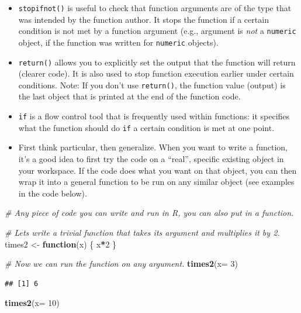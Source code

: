 \documentclass[
]{book}
\newenvironment{Shaded}{\begin{snugshade}}{\end{snugshade}}
\newcommand{\AttributeTok}[1]{\textcolor[rgb]{0.13,0.29,0.53}{#1}}
\newcommand{\CommentTok}[1]{\textcolor[rgb]{0.56,0.35,0.01}{\textit{#1}}}
\newcommand{\ControlFlowTok}[1]{\textcolor[rgb]{0.13,0.29,0.53}{\textbf{#1}}}
\newcommand{\DecValTok}[1]{\textcolor[rgb]{0.00,0.00,0.81}{#1}}
\newcommand{\FunctionTok}[1]{\textcolor[rgb]{0.13,0.29,0.53}{\textbf{#1}}}
\newcommand{\NormalTok}[1]{#1}
\newcommand{\OtherTok}[1]{\textcolor[rgb]{0.56,0.35,0.01}{#1}}
\newcommand{\SpecialCharTok}[1]{\textcolor[rgb]{0.81,0.36,0.00}{\textbf{#1}}}
\providecommand{\tightlist}{%
  \setlength{\itemsep}{0pt}\setlength{\parskip}{0pt}}
\begin{document}
\begin{itemize}
  \begin{itemize}
  \tightlist
  \item
    \texttt{stopifnot()} is useful to check that function arguments are of the type that was intended by the function author. It stops the function if a certain condition is not met by a function argument (e.g., argument is \emph{not} a \texttt{numeric} object, if the function was written for \texttt{numeric} objects).
  \item
    \texttt{return()} allows you to explicitly set the output that the function will return (clearer code). It is also used to stop function execution earlier under certain conditions. Note: If you don't use \texttt{return()}, the function value (output) is the last object that is printed at the end of the function code.
  \item
    \texttt{if} is a flow control tool that is frequently used within functions: it specifies what the function should do \texttt{if} a certain condition is met at one point.
  \item
    First think particular, then generalize. When you want to write a function, it's a good idea to first try the code on a ``real'', specific existing object in your workspace. If the code does what you want on that object, you can then wrap it into a general function to be run on any similar object (see examples in the code below).
  \end{itemize}
\end{itemize}

\begin{Shaded}
\begin{Highlighting}[]
\CommentTok{\# Any piece of code you can write and run in R, you can also put in a function.}

\CommentTok{\# Let\textquotesingle{}s write a trivial function that takes its argument and multiplies it by 2.}
\NormalTok{times2 }\OtherTok{\textless{}{-}} \ControlFlowTok{function}\NormalTok{(x) \{}
\NormalTok{  x}\SpecialCharTok{*}\DecValTok{2}
\NormalTok{\}}

\CommentTok{\# Now we can run the function on any argument.}
\FunctionTok{times2}\NormalTok{(}\AttributeTok{x=} \DecValTok{3}\NormalTok{)}
\end{Highlighting}
\end{Shaded}

\begin{verbatim}
## [1] 6
\end{verbatim}

\begin{Shaded}
\begin{Highlighting}[]
\FunctionTok{times2}\NormalTok{(}\AttributeTok{x=} \DecValTok{10}\NormalTok{)}
\end{Highlighting}
\end{Shaded}
\end{document}
